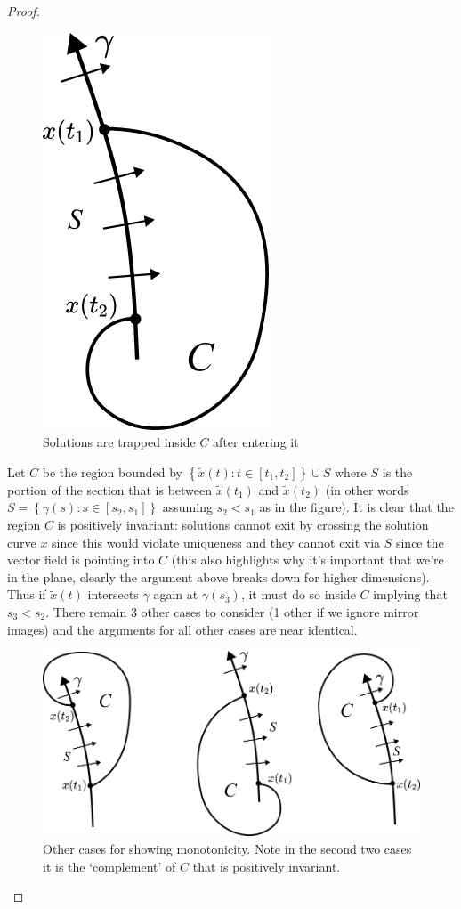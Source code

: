 \begin{proof}
\begin{figure}[ht]
    \centering
    \includegraphics[scale=0.8]{Images/section_monotone.png}
    \caption{Solutions are trapped inside $C$ after entering it}
    \label{fig:section-monotone}
\end{figure}

Let $C$ be the region bounded by $\left\{\tilde{x}(t): t \in [t_1, t_2]\right\} \cup S$ where $S$ is the portion of the section that is between $\tilde{x}(t_1)$ and $\tilde{x}(t_2)$ (in other words $S = \left\{\gamma(s) : s \in [s_2, s_1]\right\}$ assuming $s_2 < s_1$ as in the figure). It is clear that the region $C$ is positively invariant: solutions cannot exit by crossing the solution curve $x$ since this would violate uniqueness and they cannot exit via $S$ since the vector field is pointing into $C$ (this also highlights why it's important that we're in the plane, clearly the argument above breaks down for higher dimensions). Thus if $\tilde{x}(t)$ intersects $\gamma$ again at $\gamma(s_3)$, it must do so inside $C$ implying that $s_3 < s_2$. There remain 3 other cases to consider (1 other if we ignore mirror images) and the arguments for all other cases are near identical.
\begin{figure}[ht]
    \centering
    \includegraphics[scale=0.7]{Images/section_monotone_other_cases.png}
    \caption{Other cases for showing monotonicity. Note in the second two cases it is the `complement' of $C$ that is positively invariant.}
    \label{fig:section-monotone-other-cases}
\end{figure}


\end{proof}
